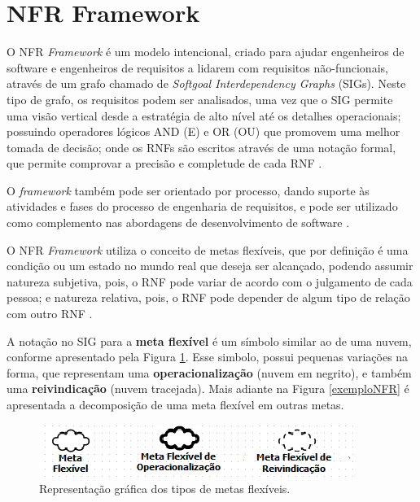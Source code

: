 \pagebreak

\section{NFR Framework}
\label{sec:NFR}

O NFR \textit{Framework}  é um modelo intencional, criado para ajudar engenheiros de software e engenheiros de requisitos a lidarem com requisitos não-funcionais, através de um grafo chamado de \textit{Softgoal Interdependency Graphs} (SIGs). Neste tipo de grafo, os requisitos podem ser analisados, uma vez que o SIG permite uma visão vertical desde a estratégia de alto nível até os detalhes operacionais;  possuindo operadores lógicos AND (E) e OR (OU) que promovem uma melhor tomada de decisão; onde  os RNFs são escritos através de uma notação formal, que permite comprovar a precisão e completude de cada RNF \cite{chung2012non}. 

O \textit{framework} também pode ser orientado por processo, dando suporte às atividades e fases do processo de engenharia de requisitos, e pode ser utilizado como complemento nas abordagens de desenvolvimento de software \cite{chung2012non}.

O NFR \textit{Framework} utiliza o conceito de metas flexíveis, que por definição é uma condição ou um estado no mundo real que deseja ser alcançado, podendo assumir natureza subjetiva, pois, o RNF pode variar de acordo com o julgamento de cada pessoa; e natureza relativa, pois, o RNF pode depender de algum tipo de relação com outro RNF \cite{chung2012non}.

\pagebreak

A notação no SIG para a \textbf{meta flexível} é um símbolo similar ao de uma nuvem, conforme apresentado pela Figura \ref{fig01}. Esse simbolo, possui pequenas variações na forma, que representam uma \textbf{operacionalização} (nuvem em negrito), e também uma \textbf{reivindicação} (nuvem tracejada). Mais adiante na Figura \ref{exemploNFR} é apresentada a decomposição de uma meta flexível em outras metas.  

\begin{figure}[h!]
	\centering
	\includegraphics[keepaspectratio=true,scale=0.9]{figuras/tiposDeSoftgoals.png}
	\caption{Representação gráfica dos tipos de metas flexíveis.}
	\label{fig01}
\end{figure} 



